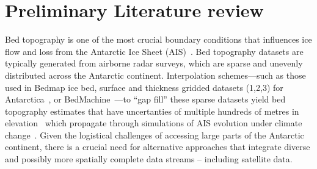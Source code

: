\chapter{Preliminary Literature review}\label{review}
Bed topography is one of the most crucial boundary conditions that influences ice flow and loss from the Antarctic Ice Sheet (AIS)~\cite{Morlighem_2020}. Bed topography datasets are typically generated from airborne radar surveys, which are sparse and unevenly distributed across the Antarctic continent. Interpolation schemes—such as those used in Bedmap ice bed, surface and thickness gridded datasets (1,2,3) for Antarctica~\cite{Lythe_2001, Fretwell_2013, Pritchard_2025}, or BedMachine~\cite{Morlighem_2017}—to ``gap fill'' these sparse datasets yield bed topography estimates that have uncertanties of multiple hundreds of metres in elevation~\cite{Morlighem_2020} which propagate through simulations of AIS evolution under climate change~\cite{Castleman_2022}. Given the logistical challenges of accessing large parts of the Antarctic continent, there is a crucial need for alternative approaches that integrate diverse and possibly more spatially complete data streams – including satellite data.

